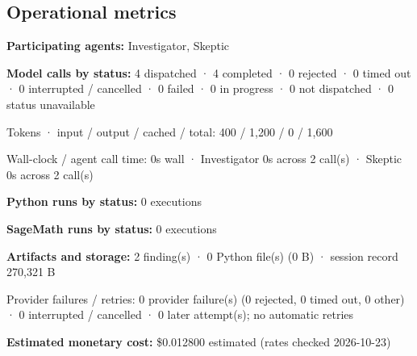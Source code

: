 \documentclass[11pt]{article}
\begin{document}
\subsection{Operational metrics}
\textbf{Participating agents:} Investigator, Skeptic\par
\textbf{Model calls by status:} 4 dispatched · 4 completed · 0 rejected · 0 timed out · 0 interrupted / cancelled · 0 failed · 0 in progress · 0 not dispatched · 0 status unavailable\par
Tokens · input / output / cached / total: 400 / 1,200 / 0 / 1,600\par
Wall-clock / agent call time: 0s wall · Investigator 0s across 2 call(s) · Skeptic 0s across 2 call(s)\par
\textbf{Python runs by status:} 0 executions\par
\textbf{SageMath runs by status:} 0 executions\par
\textbf{Artifacts and storage:} 2 finding(s) · 0 Python file(s) (0 B) · session record 270,321 B\par
Provider failures / retries: 0 provider failure(s) (0 rejected, 0 timed out, 0 other) · 0 interrupted / cancelled · 0 later attempt(s); no automatic retries\par
\textbf{Estimated monetary cost:} \$0.012800 estimated (rates checked 2026-10-23)\par
\end{document}
